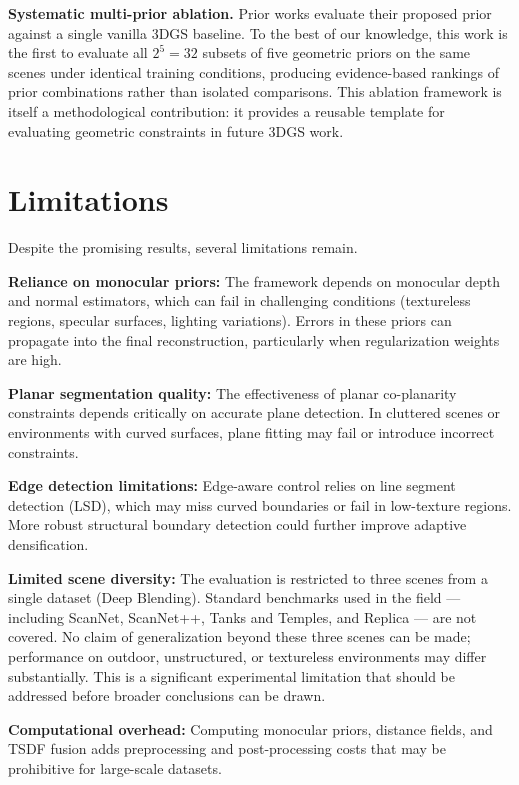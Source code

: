 \textbf{Systematic multi-prior ablation.} Prior works evaluate their proposed prior against a single vanilla 3DGS baseline. To the best of our knowledge, this work is the first to evaluate all $2^5 = 32$ subsets of five geometric priors on the same scenes under identical training conditions, producing evidence-based rankings of prior combinations rather than isolated comparisons. This ablation framework is itself a methodological contribution: it provides a reusable template for evaluating geometric constraints in future 3DGS work.

\section{Limitations}

Despite the promising results, several limitations remain.

\textbf{Reliance on monocular priors:} The framework depends on monocular depth and normal estimators, which can fail in challenging conditions (textureless regions, specular surfaces, lighting variations). Errors in these priors can propagate into the final reconstruction, particularly when regularization weights are high.

\textbf{Planar segmentation quality:} The effectiveness of planar co-planarity constraints depends critically on accurate plane detection. In cluttered scenes or environments with curved surfaces, plane fitting may fail or introduce incorrect constraints.

\textbf{Edge detection limitations:} Edge-aware control relies on line segment detection (LSD), which may miss curved boundaries or fail in low-texture regions. More robust structural boundary detection could further improve adaptive densification.

\textbf{Limited scene diversity:} The evaluation is restricted to three scenes from a single dataset (Deep Blending). Standard benchmarks used in the field — including ScanNet, ScanNet++, Tanks and Temples, and Replica — are not covered. No claim of generalization beyond these three scenes can be made; performance on outdoor, unstructured, or textureless environments may differ substantially. This is a significant experimental limitation that should be addressed before broader conclusions can be drawn.

\textbf{Computational overhead:} Computing monocular priors, distance fields, and TSDF fusion adds preprocessing and post-processing costs that may be prohibitive for large-scale datasets.

